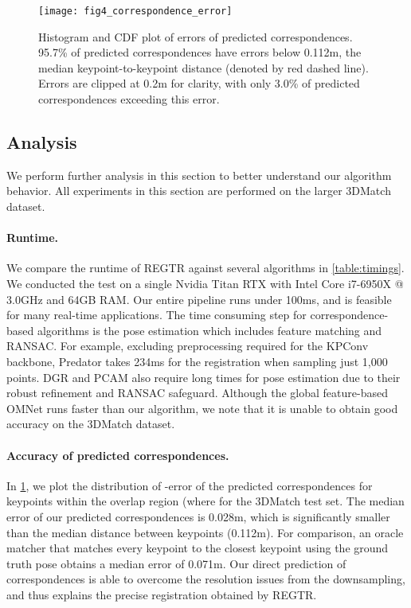 \documentclass[10pt,twocolumn,letterpaper]{article}
\begin{document}
\begin{figure}[t]
    \centering
    \texttt{[image: fig4\_correspondence\_error]}
    \vspace{-2mm}
    \caption{Histogram and CDF plot of  errors of predicted correspondences. 95.7\% of predicted correspondences have errors below 0.112m, the median keypoint-to-keypoint distance (denoted by red dashed line). Errors are clipped at 0.2m for clarity, with only 3.0\% of predicted correspondences exceeding this error.}
    \label{fig:corr_err_hist}
\end{figure}

\subsection{Analysis}
We perform further analysis in this section to better understand our algorithm behavior. All experiments in this section are performed on the larger 3DMatch dataset.

\vspace{-4mm}
\paragraph{Runtime.} We compare the runtime of REGTR against several algorithms in \cref{table:timings}. We conducted the test on a single Nvidia Titan RTX with Intel Core i7-6950X @ 3.0GHz and 64GB RAM. Our entire pipeline runs under 100ms, and is feasible for many real-time applications.
The time consuming step for correspondence-based algorithms is the pose estimation which includes feature matching and RANSAC. For example, excluding preprocessing required for the KPConv backbone, Predator \cite{huang2021predator} takes 234ms for the registration when sampling just 1,000 points. DGR \cite{choy2020dgr} and PCAM \cite{cao2021pcam} also require long times for pose estimation due to their robust refinement and RANSAC safeguard. Although the global feature-based OMNet runs faster than our algorithm, we note that it is unable to obtain good accuracy on the 3DMatch dataset.

\vspace{-4mm}
\paragraph{Accuracy of predicted correspondences.} In \cref{fig:corr_err_hist}, we plot the distribution of -error of the predicted correspondences for keypoints within the overlap region (where  for the 3DMatch test set. The median error of our predicted correspondences is 0.028m, which is significantly smaller than the median distance between keypoints (0.112m). For comparison, an oracle matcher that matches every keypoint to the closest keypoint using the ground truth pose obtains a median error of 0.071m. Our direct prediction of correspondences is able to overcome the resolution issues from the downsampling, and thus explains the precise registration obtained by REGTR.
\end{document}
